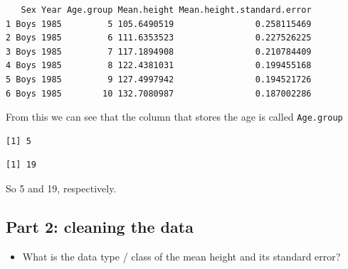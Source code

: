 \documentclass[
  letterpaper,
  DIV=11,
  numbers=noendperiod]{scrreprt}
\newenvironment{Shaded}{}{}
\newcommand{\CommentTok}[1]{\textcolor[rgb]{0.42,0.45,0.49}{#1}}
\newcommand{\FunctionTok}[1]{\textcolor[rgb]{0.44,0.26,0.76}{#1}}
\newcommand{\NormalTok}[1]{\textcolor[rgb]{0.14,0.16,0.18}{#1}}
\newcommand{\SpecialCharTok}[1]{\textcolor[rgb]{0.00,0.36,0.77}{#1}}
\providecommand{\tightlist}{%
  \setlength{\itemsep}{0pt}\setlength{\parskip}{0pt}}\usepackage{longtable,booktabs,array}
\begin{document}
\begin{tcolorbox}
\begin{verbatim}
   Sex Year Age.group Mean.height Mean.height.standard.error
1 Boys 1985         5 105.6490519                0.258115469
2 Boys 1985         6 111.6353523                0.227526225
3 Boys 1985         7 117.1894908                0.210784409
4 Boys 1985         8 122.4381031                0.199455168
5 Boys 1985         9 127.4997942                0.194521726
6 Boys 1985        10 132.7080987                0.187002286
\end{verbatim}

From this we can see that the column that stores the age is called
\texttt{Age.group}

\begin{Shaded}
\end{Shaded}

\begin{verbatim}
[1] 5
\end{verbatim}

\begin{Shaded}
\end{Shaded}

\begin{verbatim}
[1] 19
\end{verbatim}

So 5 and 19, respectively.

\end{tcolorbox}

\subsection{Part 2: cleaning the data}\label{part-2-cleaning-the-data}

\begin{itemize}
\tightlist
\item
  What is the data type / class of the mean height and its standard
  error?
\end{itemize}
\end{document}
